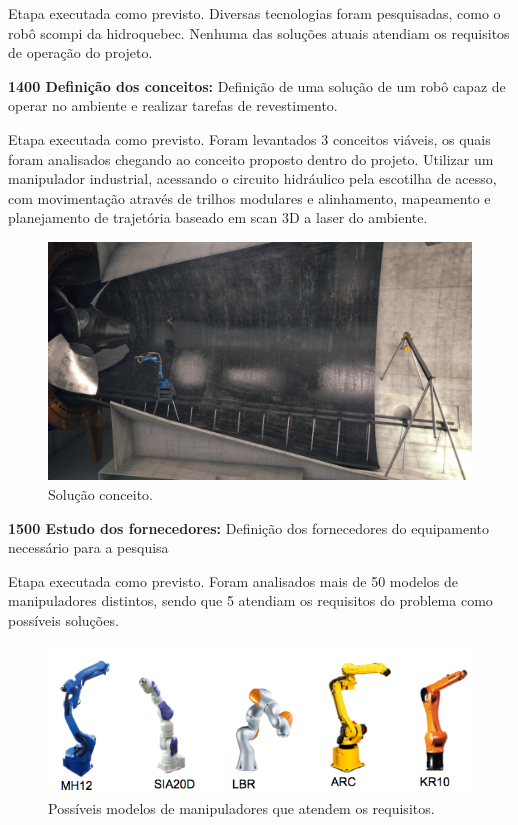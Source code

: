 Etapa executada como previsto. Diversas tecnologias foram pesquisadas, como o
robô scompi da hidroquebec. Nenhuma das soluções atuais atendiam os requisitos
de operação do projeto.

\textbf{1400 Definição dos conceitos:} Definição de uma solução de um robô capaz
de operar no ambiente e realizar tarefas de revestimento.

Etapa executada como previsto. Foram levantados 3 conceitos viáveis, os quais
foram analisados chegando ao conceito proposto dentro do projeto. Utilizar um
manipulador industrial, acessando o circuito hidráulico pela escotilha de
acesso, com movimentação através de trilhos modulares e alinhamento, mapeamento
e planejamento de trajetória baseado em scan 3D a laser do ambiente.

\begin{figure}
\centering
\includegraphics[width=0.9\columnwidth]{figs/turbine_evo}
\caption{Solução conceito.}
\end{figure}

\textbf{1500 Estudo dos fornecedores:} Definição dos fornecedores do equipamento
necessário para a pesquisa

Etapa executada como previsto. Foram analisados mais de 50 modelos de
manipuladores distintos, sendo que 5 atendiam os requisitos do problema como
possíveis soluções.

\begin{figure}[h!]
\centering
\includegraphics[width=0.9\columnwidth]{figs/robots}
\caption{Possíveis modelos de manipuladores que atendem os requisitos.}
\end{figure}

